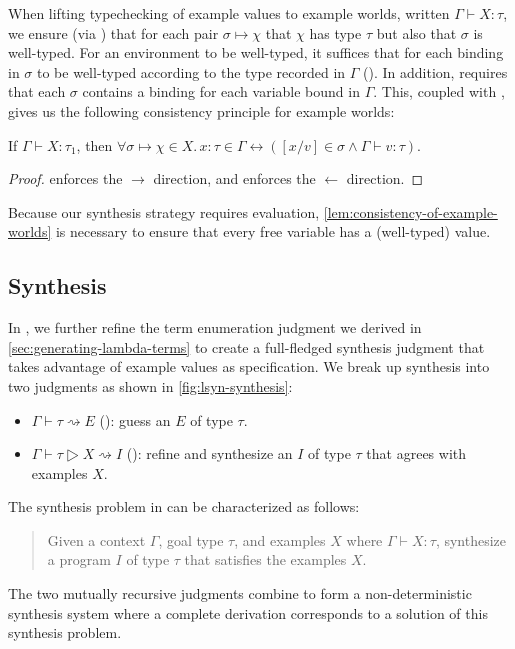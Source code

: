 When lifting typechecking of example values to example worlds, written $Γ ⊢ Χ : τ$, we ensure (via ) that for each pair $σ ↦ χ$ that $χ$ has type $τ$ but also that $σ$ is well-typed.
For an environment to be well-typed, it suffices that for each binding in $σ$ to be well-typed according to the type recorded in $Γ$ ().
In addition,  requires that each $σ$ contains a binding for each variable bound in $Γ$.
This, coupled with , gives us the following consistency principle for example worlds:
\begin{proofenv}
  \begin{lemma}
    \label{lem:consistency-of-example-worlds}
    If $Γ ⊢ Χ : τ_1$, then $∀σ ↦ χ ∈ Χ.\,x{:}τ \in Γ ↔ ([x/v] \in σ ∧ Γ ⊢ v : τ)$.
  \end{lemma}
  \begin{proof}
     enforces the $→$ direction, and  enforces the $←$ direction.
  \end{proof}
\end{proofenv}
Because our synthesis strategy requires evaluation, \autoref{lem:consistency-of-example-worlds} is necessary to ensure that every free variable has a (well-typed) value.

\subsection{Synthesis}
\label{subsec:synthesis}



In \lsyn{}, we further refine the term enumeration judgment we derived in \autoref{sec:generating-lambda-terms} to create a full-fledged synthesis judgment that takes advantage of example values as specification.
We break up synthesis into two judgments as shown in \autoref{fig:lsyn-synthesis}:
\begin{itemize}
  \item $Γ ⊢ τ ⇝ E$ (): guess an $E$ of type $τ$.
  \item $Γ ⊢ τ ▷ Χ ⇝ I$ (): refine and synthesize an $I$ of type $τ$ that agrees with examples $Χ$.
\end{itemize}
The synthesis problem in \lsyn{} can be characterized as follows:
\begin{quote}
Given a context $Γ$, goal type $τ$, and examples $Χ$ where $Γ ⊢ X : τ$, synthesize a program $I$ of type $τ$ that satisfies the examples $Χ$.
\end{quote}
The two mutually recursive judgments combine to form a non-deterministic synthesis system where a complete  derivation corresponds to a solution of this synthesis problem.

